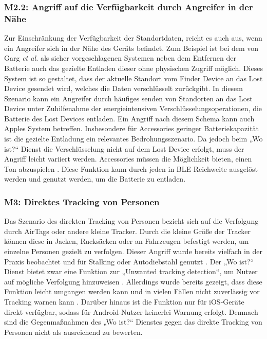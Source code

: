 \subsubsection[M2.2]{M2.2: Angriff auf die Verfügbarkeit durch Angreifer in der Nähe}
\label{missbrauch:2.2}
Zur Einschränkung der Verfügbarkeit der Standortdaten, reicht es auch aus, wenn ein Angreifer sich in der Nähe des Geräts befindet.
Zum Beispiel ist bei dem von Garg \textit{et al.} \cite{Garg_Secure_Tracker} als sicher vorgeschlagenen Systemen neben dem Entfernen der Batterie auch das gezielte Entladen dieser ohne physischen Zugriff möglich.
Dieses System ist so gestaltet, dass der aktuelle Standort vom Finder Device an das Lost Device gesendet wird, welches die Daten verschlüsselt zurückgibt.
In diesem Szenario kann ein Angreifer durch häufiges senden von Standorten an das Lost Device unter Zuhilfenahme der energieintensiven Verschlüsselungsoperationen, die Batterie des Lost Devices entladen.
Ein Angriff nach diesem Schema kann auch Apples System betreffen.
Insbesondere für Accessories geringer Batteriekapazität ist die gezielte Entladung ein relevantes Bedrohungsszenario.
Da jedoch beim „Wo ist?“ Dienst die Verschlüsselung nicht auf dem Lost Device erfolgt, muss der Angriff leicht variiert werden.
Accessories müssen die Möglichkeit bieten, einen Ton abzuspielen \cite{Apple_FindMySpec}.
Diese Funktion kann durch jeden in \ac{BLE}-Reichweite ausgelöst werden \cite{Heinrich_AirGuard} und genutzt werden, um die Batterie zu entladen.

\subsubsection[M3]{M3: Direktes Tracking von Personen}
\label{missbrauch:3}
Das Szenario des direkten Tracking von Personen bezieht sich auf die Verfolgung durch AirTags oder andere kleine Tracker.
Durch die kleine Größe der Tracker können diese in Jacken, Rucksäcken oder an Fahrzeugen befestigt werden, um einzelne Personen gezielt zu verfolgen.
Dieser Angriff wurde bereits vielfach in der Praxis beobachtet und für Stalking oder Autodiebstahl genutzt \cite{NYT_Airtags}.
Der „Wo ist?“ Dienst bietet zwar eine Funktion zur „Unwanted tracking detection“, um Nutzer auf mögliche Verfolgung hinzuweisen \cite{Apple_FindMySpec}.
Allerdings wurde bereits gezeigt, dass diese Funktion leicht umgangen werden kann \cite{Mayberry_Tracking} und in vielen Fällen nicht zuverlässig vor Tracking warnen kann \cite{Heinrich_AirGuard}.
Darüber hinaus ist die Funktion nur für iOS-Geräte direkt verfügbar, sodass für Android-Nutzer keinerlei Warnung erfolgt.
Demnach sind die Gegenmaßnahmen des „Wo ist?“ Dienstes gegen das direkte Tracking von Personen nicht als ausreichend zu bewerten.


